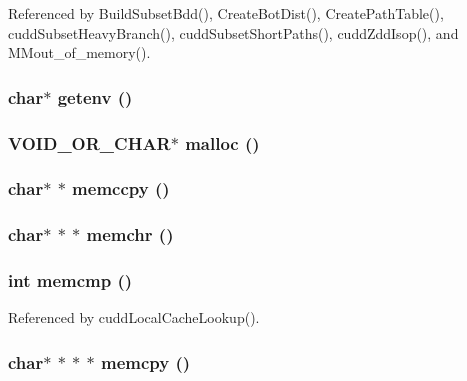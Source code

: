 Referenced by Build\-Subset\-Bdd(), Create\-Bot\-Dist(), Create\-Path\-Table(), cudd\-Subset\-Heavy\-Branch(), cudd\-Subset\-Short\-Paths(), cudd\-Zdd\-Isop(), and MMout\_\-of\_\-memory().
\subsubsection{\setlength{\rightskip}{0pt plus 5cm}char$\ast$ getenv ()}\label{util_8h_ee28fd8a0e40b6d958f7d20348e45368}


\subsubsection{\setlength{\rightskip}{0pt plus 5cm}VOID\_\-OR\_\-CHAR$\ast$ malloc ()}\label{util_8h_b2f9b020b045894653b341c1c28fe41a}


\subsubsection{\setlength{\rightskip}{0pt plus 5cm}char$\ast$ $\ast$ memccpy ()}\label{util_8h_e33aa37e7ac8b8f73a0d7d83a3257b4c}


\subsubsection{\setlength{\rightskip}{0pt plus 5cm}char$\ast$ $\ast$ $\ast$ memchr ()}\label{util_8h_3cdc8b6e8a5c007b068901aeab1e89d3}


\subsubsection{\setlength{\rightskip}{0pt plus 5cm}int memcmp ()}\label{util_8h_65c3e6b23d6855c86acaf147853c82cc}




Referenced by cudd\-Local\-Cache\-Lookup().
\subsubsection{\setlength{\rightskip}{0pt plus 5cm}char$\ast$ $\ast$ $\ast$ $\ast$ memcpy ()}\label{util_8h_536220a4deb3dfd2b1fdd6e57b0bc4dd}




